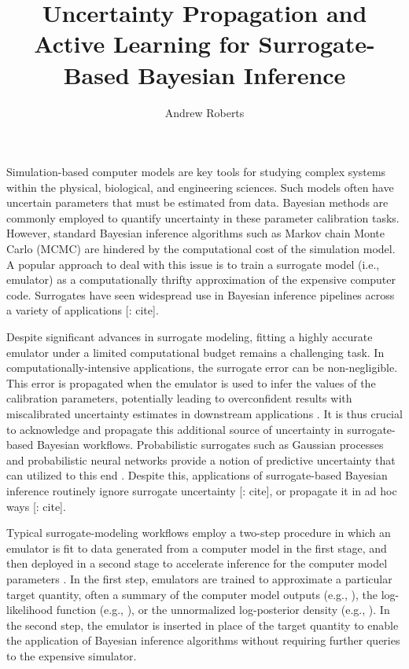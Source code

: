 \documentclass[12pt]{article}
\title{Uncertainty Propagation and Active Learning for Surrogate-Based Bayesian Inference}
\author{Andrew Roberts}
\begin{document}
\maketitle

Simulation-based computer models are key tools for studying complex systems within 
the physical, biological, and engineering sciences. 
Such models often have uncertain parameters that must be estimated from data. 
Bayesian methods are commonly employed
to quantify uncertainty in these parameter calibration tasks.
However, standard Bayesian inference algorithms such as Markov chain Monte Carlo (MCMC) 
are hindered by the computational cost of the simulation model.
A popular approach to deal with this issue is to train a surrogate model 
(i.e., emulator) as a computationally thrifty approximation of the expensive computer code.
Surrogates have seen widespread use in Bayesian inference pipelines across a variety 
of applications [\todo: cite]. 

Despite significant advances in surrogate modeling, fitting a 
highly accurate emulator under a limited computational budget remains a challenging task.
In computationally-intensive applications, the surrogate error can be non-negligible. 
This error is propagated when the emulator is used to infer the values of the calibration 
parameters, potentially leading to overconfident results with miscalibrated uncertainty 
estimates in downstream applications \citep{BurknerSurrogate}.
It is thus crucial to acknowledge and propagate this 
additional source of uncertainty in surrogate-based Bayesian workflows.
Probabilistic surrogates such as Gaussian processes \citep{gpML,gramacy2020surrogates} 
and probabilistic neural networks \citep{deepEnsembles,BayesOptNN} provide a notion of 
predictive uncertainty that can utilized to this end
 \citep{reviewPaper,BilionisBayesSurrogates,BurknerSurrogate,CES,FerEmulation}.
 Despite this, applications of surrogate-based Bayesian inference routinely ignore 
 surrogate uncertainty [\todo: cite], or propagate it in ad hoc ways [\todo: cite].
 
Typical surrogate-modeling workflows employ a two-step procedure
in which an emulator is fit to data generated from a computer model in the first stage, 
and then deployed in a second stage to accelerate inference for the computer 
model parameters \citep{modularization,BurknerTwoStep,BurknerSurrogate}. 
In the first step, emulators are trained to approximate a particular target quantity, 
often a summary of the computer model outputs 
(e.g., \citet{hydrologicalModel,idealizedGCM,Surer2023sequential}), the log-likelihood
function (e.g., \citet{VehtariParallelGP,FATES_CES,trainDynamics}), or the unnormalized 
log-posterior density (e.g., \citet{emPostDens,gp_surrogates_random_exploration,Kandasamy_2017}).
In the second step, the emulator 
is inserted in place of the target quantity to enable the application of Bayesian inference  
algorithms without requiring further queries to the expensive simulator.
\end{document}
